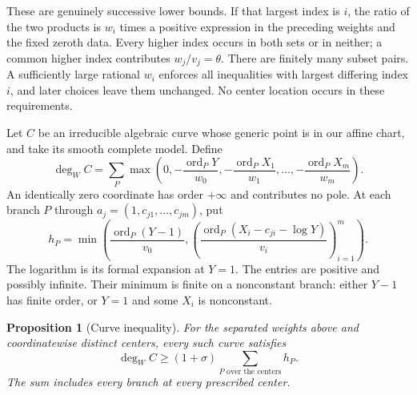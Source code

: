 \documentclass[11pt]{article}
\newtheorem{proposition}[theorem]{Proposition}
\theoremstyle{definition}
\theoremstyle{remark}
\newcommand{\ord}{\operatorname{ord}}
\numberwithin{equation}{section}
\begin{document}
These are genuinely successive lower bounds. If that largest index is
\(i\), the ratio of the two products is \(w_i\) times a positive
expression in the preceding weights and the fixed zeroth data. Every
higher index occurs in both sets or in neither; a common higher index
contributes \(w_j/v_j=\theta\). There are finitely many subset pairs.
A sufficiently large rational \(w_i\) enforces all inequalities with
largest differing index \(i\), and later choices leave them unchanged.
No center location occurs in these requirements.

Let \(C\) be an irreducible algebraic curve whose generic point is
in our affine chart, and take its smooth complete model. Define
\begin{equation}\label{eq:curvedegree}
 \deg_W C=\sum_P\max\left(0,
 -\frac{\ord_PY}{w_0},-\frac{\ord_PX_1}{w_1},\ldots,
 -\frac{\ord_PX_m}{w_m}\right).
\end{equation}
An identically zero coordinate has order \(+\infty\) and contributes
no pole. At each branch \(P\) through \(a_j=(1,c_{j1},\ldots,c_{jm})\),
put
\begin{equation}\label{eq:contact}
 h_P=\min\left(\frac{\ord_P(Y-1)}{v_0},
 \left(\frac{\ord_P(X_i-c_{ji}-\log Y)}{v_i}\right)_{i=1}^m\right).
\end{equation}
The logarithm is its formal expansion at \(Y=1\). The entries are
positive and possibly infinite. Their minimum is finite on a
nonconstant branch: either \(Y-1\) has finite order, or \(Y=1\)
and some \(X_i\) is nonconstant.

\begin{proposition}[Curve inequality]\label{prop:curve}
For the separated weights above and coordinatewise distinct centers,
every such curve satisfies
\begin{equation}\label{eq:CI}
 \deg_W C\ge(1+\sigma)\sum_{P\text{ over the centers}}h_P.
\end{equation}
The sum includes every branch at every prescribed center.
\end{proposition}
\end{document}

